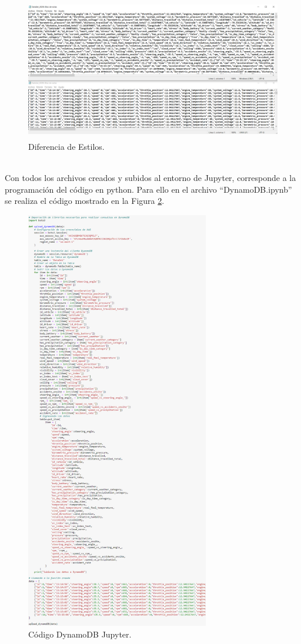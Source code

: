 \documentclass[a4paper,10pt, oneside, titlepage]{article}
\begin{document}
	\begin{figure}[!h]
		\centering
		\includegraphics[width = 1\linewidth, height = 6.2cm]{Formato_JSON_TXT.png}
		\caption{Diferencia de Estilos.}
		\label{Formato_JSON_TXT}
	\end{figure} \\
	\indent Con todos los archivos creados y subidos al entorno de Jupyter, corresponde a la programación del código en python. Para ello en el archivo ``DynamoDB.ipynb'' se realiza el código mostrado en la Figura \ref{Codigo_DynamoDB_Jupyter}.
	\begin{figure}[!h]
		\centering
		\includegraphics[width = 1\linewidth, height = 18.5cm]{Codigo_DynamoDB_Jupyter.png}
		\caption{Código DynamoDB Jupyter.}
		\label{Codigo_DynamoDB_Jupyter}
	\end{figure} \\
\end{document}

